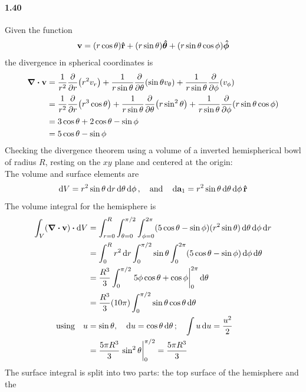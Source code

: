 \documentclass[../main.tex]{subfiles}
\begin{document}
\paragraph{1.40}
Given the function
\begin{align*}
    \vb{v} = (r \cos\theta) \vu{r} + (r \sin\theta) \vu*{\theta} + (r\sin\theta \cos\phi) \vu*{\phi}
\end{align*}
the divergence in spherical coordinates is
\begin{align*}
    \div{\vb{v}} &= \frac{1}{r^2} \pdv{r} (r^2 v_r)
        + \frac{1}{r \sin\theta} \pdv{\theta} (\sin\theta v_\theta)
        + \frac{1}{r \sin\theta} \pdv{\phi} (v_\phi) \\
    &= \frac{1}{r^2} \pdv{r} (r^3 \cos\theta)
        + \frac{1}{r \sin\theta} \pdv{\theta} (r \sin^2\theta)
        + \frac{1}{r \sin\theta} \pdv{\phi} (r\sin\theta \cos\phi) \\
    &= 3 \cos\theta + 2 \cos\theta - \sin\phi \\
    &= 5 \cos\theta - \sin\phi
\end{align*}
Checking the divergence theorem using a volume of a inverted hemispherical bowl of radius $R$,
resting on the $xy$ plane and centered at the origin: \\
The volume and surface elements are
\begin{align*}
    \dd{V} = r^2 \sin\theta \dd{r}\dd{\theta}\dd{\phi}, \qand
    \dd{\vb{a}_1} = r^2 \sin\theta \dd{\theta}\dd{\phi} \vu{r}
\end{align*}
The volume integral for the hemisphere is
\begin{align*}
    \int_V (\div{\vb{v}}) \vdot \dd{V} &= \int_{r=0}^R \int_{\theta=0}^{\pi/2} \int_{\phi=0}^{2\pi}
        (5 \cos\theta - \sin\phi) (r^2 \sin\theta) \dd{\theta}\dd{\phi} \dd{r} \\
    &= \int_0^R r^2 \dd{r} \int_0^{\pi/2} \sin\theta
    \int_0^{2\pi} (5 \cos\theta - \sin\phi) \dd{\phi} \dd{\theta} \\
    &= \frac{R^3}{3} \int_0^{\pi/2}
    \eval{5\phi \cos\theta + \cos\phi}_0^{2\pi} \dd{\theta} \\
    &= \frac{R^3}{3} (10\pi) \int_0^{\pi/2} \sin\theta \cos\theta \dd{\theta} \\
    \qusing u &= \sin\theta, \quad \dd{u} = \cos\theta \dd{\theta};
    \quad \int u \dd{u} = \frac{u^2}{2} \\
    &= \frac{5\pi R^3}{3} \eval{\sin^2\theta}_0^{\pi/2} = \frac{5\pi R^3}{3}
\end{align*}
The surface integral is split into two parts: the top surface of the hemisphere and the
\end{document}
